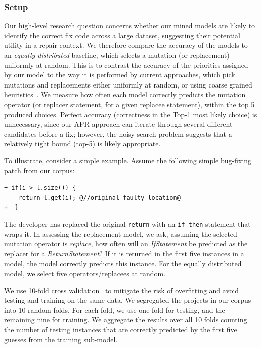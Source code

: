 \documentclass[conference]{IEEEtran}
\begin{document}
\subsubsection{Setup}
Our high-level research question concerns whether 
our mined models are likely to identify the correct fix code across a large
dataset, suggesting their potential utility in a repair context.  We therefore
compare the accuracy of the models to an \emph{equally distributed} baseline,
which selects a mutation (or replacement) uniformly at random. This is to contrast 
the accuracy of the priorities assigned by our model to the way it is
performed by current approaches, which pick mutations and replacements either
uniformly at random, or using coarse grained heuristics~\cite{legoues12Genprog,kim2013,Qi13TrpAutoR,Weimer13}.
We measure how often each model correctly predicts the mutation operator (or
replacer statement, for a given replacee statement), within the top 5 produced
choices. Perfect accuracy (correctness in the Top-1 most likely choice) is
unnecessary, since our APR approach can iterate through several
different candidates before a fix; 
however, the noisy search problem suggests that a relatively tight bound (top-5)
is likely appropriate.

To illustrate, consider a simple example. Assume the following
simple bug-fixing patch from our corpus: 

\begin{lstlisting}[frame=single]
+ if(i > l.size()) {
    return l.get(i); @//original faulty location@
+  }    
\end{lstlisting}

The developer has replaced the original \texttt{return} with an
\texttt{if-then} statement that wraps it.  In assessing the replacement model,
we ask, assuming the selected mutation operator 
is \emph{replace}, how often will an \emph{IfStatement} be predicted as the
replacer for a \emph{ReturnStatement}? If it is returned in the first five
instances in a model, the model correctly predicts this instance.  For the
equally distributed model, we select five operators/replacees at random. 

We use 10-fold cross validation~\cite{kohavi95} to mitigate the risk
of overfitting and avoid testing and training on the same data.  We segregated
the projects in our corpus into 10 random folds. For each fold, we use one fold
for testing, and the remaining nine for training. We aggregate the results over
all 10 folds counting the number of testing instances that are correctly
predicted by the first five guesses from the training sub-model.
\end{document}
